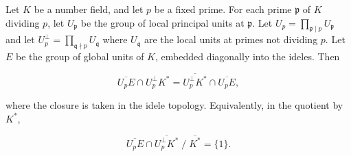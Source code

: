 Let $K$ be a number field, and let $p$ be a fixed prime. For each prime $\mathfrak{p}$ of $K$ dividing $p$, let $U_\mathfrak{p}$ be the group of local principal units at $\mathfrak{p}$. Let $U_p = \prod_{\mathfrak{p} \mid p} U_\mathfrak{p}$ and let $U_p^\perp = \prod_{\mathfrak{q} \nmid p} U_\mathfrak{q}$ where $U_\mathfrak{q}$ are the local units at primes not dividing $p$. Let $E$ be the group of global units of $K$, embedded diagonally into the ideles. Then

$$\overline{U_p E} \cap U_p^\perp K^* = \overline{U_p^\perp K^*} \cap \overline{U_p E},$$

where the closure is taken in the idele topology. Equivalently, in the quotient by $K^*$,

$$\overline{U_p E} \cap \overline{U_p^\perp K^*} \;/\; \overline{K^*} = \{1\}.$$
